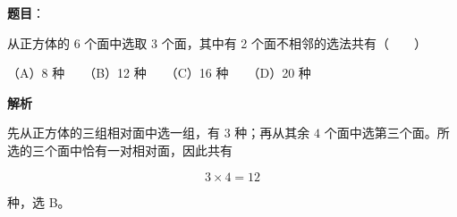 \begin{answer}

\textbf{题目}：

从正方体的 6 个面中选取 3 个面，其中有 2 个面不相邻的选法共有\mbox{（　　）}

（A）8 种　　（B）12 种　　（C）16 种　　（D）20 种

\textbf{解析}

先从正方体的三组相对面中选一组，有 $3$ 种；再从其余 $4$ 个面中选第三个面。所选的三个面中恰有一对相对面，因此共有

\nopagebreak[4]
\[
3\times4=12
\]

种，选 B。


\end{answer}

